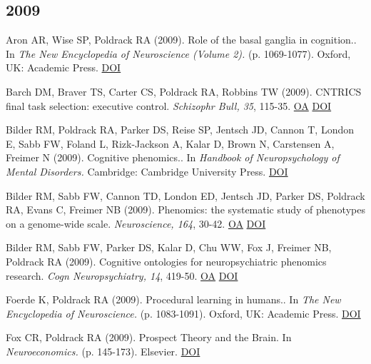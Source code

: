 \subsection*{2009}

Aron AR, Wise SP, Poldrack RA (2009). Role of the basal ganglia in cognition.. In \textit{The New Encyclopedia of Neuroscience (Volume 2).} (p. 1069-1077). Oxford, UK: Academic Press. \href{http://dx.doi.org/978-0080447971}{DOI} \vspace{2mm}

Barch DM, Braver TS, Carter CS, Poldrack RA, Robbins TW (2009). CNTRICS final task selection: executive control. \textit{Schizophr Bull, 35}, 115-35. \href{https://www.ncbi.nlm.nih.gov/pmc/articles/PMC2643948}{OA} \href{http://dx.doi.org/10.1093/schbul/sbn154}{DOI} \vspace{2mm}

Bilder RM, Poldrack RA, Parker DS, Reise SP, Jentsch JD, Cannon T, London E, Sabb FW, Foland L, Rizk-Jackson A, Kalar D, Brown N, Carstensen A, Freimer N (2009). Cognitive phenomics.. In \textit{Handbook of Neuropsychology of Mental Disorders.} Cambridge: Cambridge University Press. \href{http://dx.doi.org/rjoyrcvt}{DOI} \vspace{2mm}

Bilder RM, Sabb FW, Cannon TD, London ED, Jentsch JD, Parker DS, Poldrack RA, Evans C, Freimer NB (2009). Phenomics: the systematic study of phenotypes on a genome-wide scale. \textit{Neuroscience, 164}, 30-42. \href{https://www.ncbi.nlm.nih.gov/pmc/articles/PMC2760679}{OA} \href{http://dx.doi.org/10.1016/j.neuroscience.2009.01.027}{DOI} \vspace{2mm}

Bilder RM, Sabb FW, Parker DS, Kalar D, Chu WW, Fox J, Freimer NB, Poldrack RA (2009). Cognitive ontologies for neuropsychiatric phenomics research. \textit{Cogn Neuropsychiatry, 14}, 419-50. \href{https://www.ncbi.nlm.nih.gov/pmc/articles/PMC2752634}{OA} \href{http://dx.doi.org/10.1080/13546800902787180}{DOI} \vspace{2mm}

Foerde K, Poldrack RA (2009). Procedural learning in humans.. In \textit{The New Encyclopedia of Neuroscience.} (p. 1083-1091). Oxford, UK: Academic Press. \href{http://dx.doi.org/978-0080447971-xey}{DOI} \vspace{2mm}

Fox CR, Poldrack RA (2009). Prospect Theory and the Brain. In \textit{Neuroeconomics.} (p. 145-173). Elsevier. \href{http://dx.doi.org/10.1016/b978-0-12-374176-9.00011-7}{DOI} \vspace{2mm}

